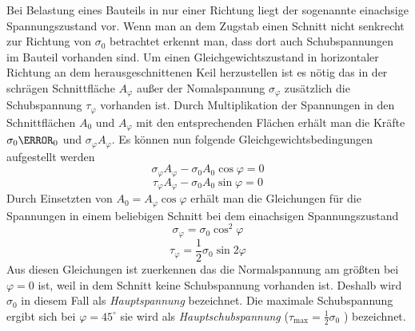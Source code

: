 \documentclass[12pt,a4paper,parskip,twoside,BCOR5mm,headsepline]{scrartcl}
\begin{document}
\begin{description*}
Bei Belastung eines Bauteils in nur einer Richtung liegt der sogenannte einachsige Spannungszustand vor. Wenn man an dem Zugstab  einen Schnitt nicht senkrecht zur Richtung von $ \sigma_0 $ betrachtet erkennt man, dass dort auch Schubspannungen im Bauteil vorhanden sind. Um einen Gleichgewichtszustand in horizontaler Richtung an dem herausgeschnittenen Keil herzustellen ist es nötig das in der schrägen Schnittfläche $ A_{\varphi} $ außer der Nomalspannung $ \sigma_{\varphi} $ zusätzlich die Schubspannung $ \tau_{\varphi} $ vorhanden ist. Durch Multiplikation der Spannungen in den Schnittflächen $ A_0 $ und $ A_{\varphi} $ mit den entsprechenden Flächen erhält man die Kräfte $ \sigma_0 \A_0 $ und $ \sigma_{\varphi} A_{\varphi} $. Es können nun folgende Gleichgewichtsbedingungen aufgestellt werden \begin{equation}
\sigma_{\varphi}A_{\varphi} - \sigma_0 A_0\cos{\varphi} = 0  
\end{equation}
\begin{equation}
\tau_{\varphi}A_{\varphi} - \sigma_0A_0\sin{\varphi} = 0
\end{equation} Durch Einsetzten von $ A_0 = A_{\varphi}\cos{\varphi}$ erhält man die Gleichungen für die Spannungen in einem beliebigen Schnitt bei dem einachsigen Spannungszustand
\begin{equation}
\sigma_{\varphi} = \sigma_0\cos^2{\varphi}
\end{equation}
\begin{equation}
\tau_{\varphi} = \frac{1}{2} \sigma_0\sin{2\varphi}
\end{equation}
Aus diesen Gleichungen ist zuerkennen das die Normalspannung am größten bei $ \varphi = 0 $ ist, weil in dem Schnitt keine Schubspannung vorhanden ist. Deshalb wird $ \sigma_0 $ in diesem Fall als \emph{Hauptspannung} bezeichnet. Die maximale Schubspannung ergibt sich bei $ \varphi = 45^{\circ} $ sie wird als \emph{Hauptschubspannung} ($ \tau_{\text{max}} = \frac{1}{2}\sigma_0 $ ) bezeichnet.\autocite[388]{dd}



  

\end{description*}
\end{document}
